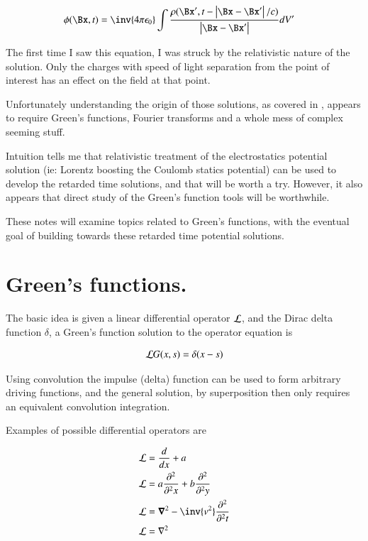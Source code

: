 \begin{align*}
\phi(\Bx, t) &= \inv{4 \pi \epsilon_0} \int \frac{\rho(\Bx', t - \Abs{\Bx-\Bx'}/c)}{\Abs{\Bx - \Bx'}} dV'
\end{align*}

The first time I saw this equation, I was struck by the relativistic nature of the solution.  Only the charges with speed of light separation from the point of interest has an effect on the field at that point.

Unfortunately understanding the origin of those solutions, as covered in
\cite{ FitzRelEandM }, 
appears to require Green's functions, Fourier transforms and a whole mess
of complex seeming stuff.

Intuition tells me that relativistic treatment
of the electrostatics potential solution (ie: Lorentz boosting the Coulomb
statics potential) 
can be used to develop the 
retarded time solutions, and that will be worth a try.  However, it also
appears that direct study of the Green's
function tools will be worthwhile.

These notes will examine topics related to
Green's functions, with the eventual goal of building towards these
retarded time potential solutions.

\section{Green's functions. }

The basic idea is given a
linear differential operator $\mathcal{L}$, and the Dirac delta function $\delta$, a Green's function solution to the operator equation is

\begin{align*}
\mathcal{L} G(x,s) = \delta(x-s)
\end{align*}

Using convolution the impulse (delta) function can be used to form
arbitrary driving functions, and the general solution, by superposition
then only requires an equivalent convolution integration.

Examples of possible differential operators are

\begin{align*}
\LL &= \frac{d}{dx} + a \\
\LL &= a \PDsq{x}{} + b \PDsq{y}{} \\
\LL &= \spacegrad^2 - \inv{v^2}\PDsq{t}{}\\
\LL &= \grad^2 \\
\end{align*}

